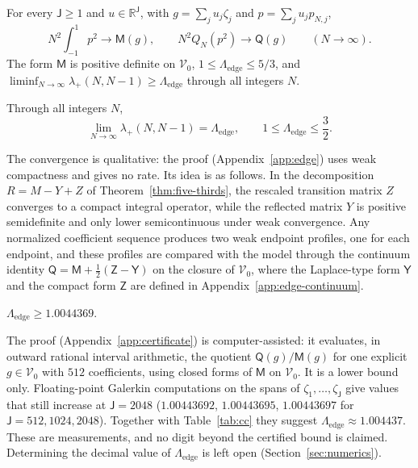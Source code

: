 \documentclass{siamart251216}
\newcommand{\R}{\mathbb R}
\begin{document}
\begin{proposition}\label{prop:fixed-trial}%
For every $\mathsf J\ge1$ and $u\in\R^{\mathsf J}$, with $g=\sum_ju_j\zeta_j$ and
$p=\sum_ju_jp_{N,j}$,
\[
 N^2\int_{-1}^1p^2\longrightarrow\mathsf M(g),\qquad
 N^2Q_N(p^2)\longrightarrow\mathsf Q(g)\qquad(N\to\infty).
\]
The form $\mathsf M$ is positive definite on $\mathcal V_0$,
$1\le\Lambda_{\mathrm{edge}}\le5/3$, and
$\liminf_{N\to\infty}\lambda_+(N,N-1)\ge\Lambda_{\mathrm{edge}}$ through
all integers $N$.
\end{proposition}

\begin{theorem}\label{thm:edge-limit}%
Through all integers $N$,
\[
 \lim_{N\to\infty}\lambda_+(N,N-1)=\Lambda_{\mathrm{edge}},\qquad
 1\le\Lambda_{\mathrm{edge}}\le\frac32 .
\]
\end{theorem}

The convergence is qualitative: the proof (Appendix~\ref{app:edge}) uses
weak compactness and gives no rate. Its idea is as follows. In the
decomposition $R=M-Y+Z$ of Theorem~\ref{thm:five-thirds}, the rescaled
transition matrix $Z$ converges to a compact integral operator, while the
reflected matrix $Y$ is positive semidefinite and only lower semicontinuous
under weak convergence. Any normalized coefficient sequence produces two
weak endpoint profiles, one for each endpoint, and these profiles are
compared with the model through the continuum identity
$\mathsf Q=\mathsf M+\tfrac12(\mathsf Z-\mathsf Y)$ on the closure of
$\mathcal V_0$, where the Laplace-type form $\mathsf Y$ and the compact form
$\mathsf Z$ are defined in Appendix~\ref{app:edge-continuum}.

\begin{proposition}\label{prop:edge-certified}%
$\Lambda_{\mathrm{edge}}\ge1.0044369$.
\end{proposition}

The proof (Appendix~\ref{app:certificate}) is computer-assisted: it evaluates,
in outward rational interval arithmetic, the quotient
$\mathsf Q(g)/\mathsf M(g)$ for one explicit $g\in\mathcal V_0$ with $512$
coefficients, using closed forms of $\mathsf M$ on $\mathcal V_0$. It is a
lower bound only. Floating-point Galerkin computations on the spans of
$\zeta_1,\dots,\zeta_{\mathsf J}$ give values that still increase at
$\mathsf J=2048$ ($1.00443692$, $1.00443695$, $1.00443697$ for
$\mathsf J=512,1024,2048$). Together with Table~\ref{tab:cc} they suggest
$\Lambda_{\mathrm{edge}}\approx1.004437$. These are measurements, and no
digit beyond the certified bound is claimed. Determining the decimal value of
$\Lambda_{\mathrm{edge}}$ is left open (Section~\ref{sec:numerics}).
\end{document}
